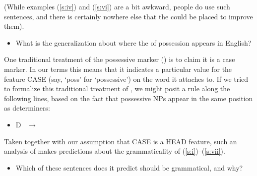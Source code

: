 \documentclass[a4paper,landscape,headrule,footrule]{foils}
\begin{document}
\begin{exe}
\ex  {}
\ex  {}\label{s:i}
\ex  {}
\ex  {}\label{s:iv}
\ex {}
\ex  {}\label{s:vi}
\ex  {}\label{s:vii}
\end{exe}
(While examples (\ref{s:iv}) and (\ref{s:vi}) are a bit awkward, people do use such
sentences, and there is certainly nowhere else that the  could
be placed to improve them).  
\begin{itemize}
\item[A.] What is the generalization about where the  of
possession appears in English?
\end{itemize}
\newpage

One
traditional treatment of the possessive marker ()
is to
claim it is a  case marker.
In our terms this means that it indicates 
a particular value for the feature CASE (say, `poss' for `possessive')
on the word it attaches to.
If we tried to formalize this traditional treatment of , we
might posit
a rule along the following lines, 
based on the fact that possessive NPs appear in the same position as determiners:
\begin{itemize}
\item[] D \ $\rightarrow$\ \ 
\end{itemize}
Taken together with our assumption that CASE is
a HEAD feature,  such an analysis of  
makes predictions about the grammaticality of (\ref{s:i})--(\ref{s:vii}).  
\begin{itemize}
\item[B.] Which of these sentences does it
predict should be grammatical, and why?

\end{itemize}
\end{document}
